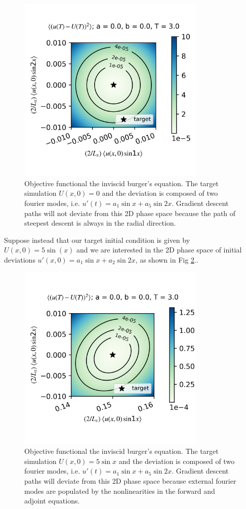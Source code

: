 \documentclass[longbibliography,amsmath,amssymb,aps,nofootinbib]{revtex4-2}
\begin{document}
\begin{figure}[H]
  \includegraphics[width=9cm]{objtest_a0p0b0p0T3p0R0p01kt10p0kt20.png}
  \caption{Objective functional the inviscid burger's equation. The target simulation $U(x, 0) = 0$ and the deviation is composed of two fourier modes, i.e. $u'(t) = a_1\sin x + a_5\sin 2x$. Gradient descent paths will not deviate from this 2D phase space because the path of steepest descent is always in the radial direction.}
  \label{brgU0}
\end{figure}

Suppose instead that our target initial condition is given by $U(x, 0) = 5\sin(x)$ and we are interested in the 2D phase space of initial deviations $u'(x, 0) = a_1\sin x + a_2 \sin 2x$, as shown in Fig \ref{brgU5m1}.. 

\begin{figure}[H]
  \includegraphics[width=9cm]{objtest_a0p0b0p0T3p0R0p01kt10p15kt20.png}
  \caption{Objective functional the inviscid burger's equation. The target simulation $U(x, 0) = 5\sin x$ and the deviation is composed of two fourier modes, i.e. $u'(t) = a_1\sin x + a_5\sin 2x$. Gradient descent paths will deviate from this 2D phase space because external fourier modes are populated by the nonlinearities in the forward and adjoint equations.}
  \label{brgU5m1}
\end{figure}


\clearpage

\end{document}
